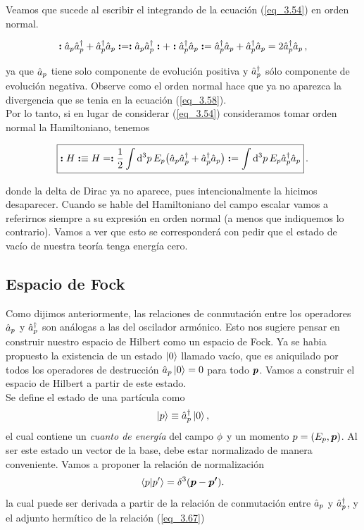 Veamos que sucede al escribir el integrando de la ecuación (\ref{eq_3.54}) en orden normal. 

\begin{equation}
    \vb*{:}  \hat{a}_p \hat{a}^{\dag}_{p} + \hat{a}^{\dag}_p\hat{a}_{p} \vb*{:}  = \vb*{:}  \hat{a}_p \hat{a}^{\dag}_{p} \vb*{:}  + \vb*{:}  \hat{a}^{\dag}_p\hat{a}_{p} \vb*{:}  = \hat{a}^{\dag}_p\hat{a}_{p}+\hat{a}^{\dag}_p\hat{a}_{p} = 2 \hat{a}^{\dag}_p \hat{a}_{p} \, ,
\end{equation}

ya que $\hat{a}_{p}$ tiene solo componente de evolución positiva y $\hat{a}^{\dag}_p$ sólo componente de evolución negativa. Observe como el orden normal hace que ya no aparezca la divergencia que se tenia en la ecuación (\ref{eq_3.58}).\\

Por lo tanto, si en lugar de considerar (\ref{eq_3.54}) consideramos tomar orden normal la Hamiltoniano, tenemos

\begin{equation}
\boxed{
   \vb*{:}  H \vb*{:}  \equiv H = \vb*{:}  \frac{1}{2} \int \dd[3]{p} E_p \qty( \hat{a}_p \hat{a}^{\dag}_{p} + \hat{a}^{\dag}_p\hat{a}_{p}) \vb*{:}  = \int \dd[3]{p} E_p \hat{a}^{\dag}_p\hat{a}_{p} }\, . \label{eq_3.66}    
\end{equation}

donde la delta de Dirac ya no aparece, pues intencionalmente la hicimos desaparecer. Cuando se hable del Hamiltoniano del campo escalar vamos a referirnos siempre a su expresión en orden normal (a menos que indiquemos lo contrario). Vamos a ver que esto se corresponderá con pedir que el estado de vacío de nuestra teoría tenga energía cero.\\

\subsection{Espacio de Fock} \label{Efockes}

Como dijimos anteriormente, las relaciones de conmutación entre los operadores $\hat{a}_p$ y $\hat{a}_p^\dagger$ son análogas a las del oscilador armónico. Esto nos sugiere pensar en construir nuestro espacio de Hilbert como un espacio de Fock. Ya se habia propuesto la existencia de un estado $\ket{0}$ llamado vacío, que es aniquilado por todos los operadores de destrucción $\hat{a}_p \ket{0}=0$ para todo $\vb*{p}$. Vamos a construir el espacio de Hilbert a partir de este estado.\\

Se define el estado de una partícula como
\begin{equation}
    \ket{p} \equiv \hat{a}^\dag_p \ket{0}, 
    \label{eq_3.67}
\end{equation}
el cual contiene un \emph{cuanto de energía} del campo $\phi$ y un momento $p=(E_p,\vb*{p})$. Al ser este estado un vector de la base, debe estar normalizado de manera conveniente. Vamos a proponer la relación de normalización
\begin{equation}
    \braket{p}{p^\prime}=\delta^3 \qty(\vb*{p}-\vb*{p^\prime}).
\end{equation}
la cual puede ser derivada a partir de la relación de conmutación entre $\hat{a}_p$ y $\hat{a}_p^\dagger$, y el adjunto hermítico de la relación (\ref{eq_3.67})

